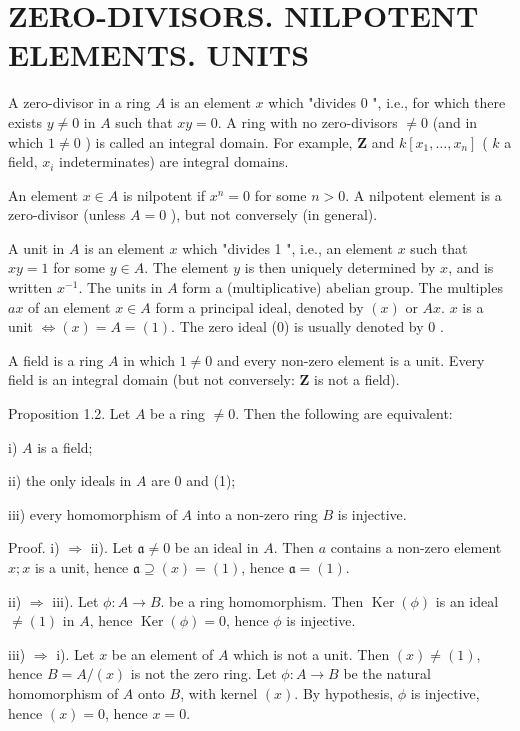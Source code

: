 \documentclass{standalone}
\theoremstyle{definition}
\theoremstyle{remark}
\begin{document}
\section{ZERO-DIVISORS. NILPOTENT ELEMENTS. UNITS}
A zero-divisor in a ring $A$ is an element $x$ which "divides 0 ", i.e., for which there exists $y \neq 0$ in $A$ such that $x y=0$. A ring with no zero-divisors $\neq 0$ (and in which $1 \neq 0$ ) is called an integral domain. For example, $\mathbf{Z}$ and $k\left[x_{1}, \ldots, x_{n}\right]$ ( $k$ a field, $x_{i}$ indeterminates) are integral domains.

An element $x \in A$ is nilpotent if $x^{n}=0$ for some $n>0$. A nilpotent element is a zero-divisor (unless $A=0$ ), but not conversely (in general).

A unit in $A$ is an element $x$ which "divides 1 ", i.e., an element $x$ such that $x y=1$ for some $y \in A$. The element $y$ is then uniquely determined by $x$, and is written $x^{-1}$. The units in $A$ form a (multiplicative) abelian group. The multiples $a x$ of an element $x \in A$ form a principal ideal, denoted by $(x)$ or $A x$. $x$ is a unit $\Leftrightarrow(x)=A=(1)$. The zero ideal (0) is usually denoted by 0 .

A field is a ring $A$ in which $1 \neq 0$ and every non-zero element is a unit. Every field is an integral domain (but not conversely: $\mathbf{Z}$ is not a field).

Proposition 1.2. Let $A$ be a ring $\neq 0$. Then the following are equivalent:

i) $A$ is a field;

ii) the only ideals in $A$ are 0 and (1);

iii) every homomorphism of $A$ into a non-zero ring $B$ is injective.

Proof. i) $\Rightarrow$ ii). Let $\mathfrak{a} \neq 0$ be an ideal in $A$. Then $a$ contains a non-zero element $x ; x$ is a unit, hence $\mathfrak{a} \supseteq(x)=(1)$, hence $\mathfrak{a}=(1)$.

ii) $\Rightarrow$ iii). Let $\phi: A \rightarrow B$. be a ring homomorphism. Then $\operatorname{Ker}(\phi)$ is an ideal $\neq(1)$ in $A$, hence $\operatorname{Ker}(\phi)=0$, hence $\phi$ is injective.

iii) $\Rightarrow$ i). Let $x$ be an element of $A$ which is not a unit. Then $(x) \neq(1)$, hence $B=A /(x)$ is not the zero ring. Let $\phi: A \rightarrow B$ be the natural homomorphism of $A$ onto $B$, with kernel $(x)$. By hypothesis, $\phi$ is injective, hence $(x)=0$, hence $x=0$.
\end{document}
